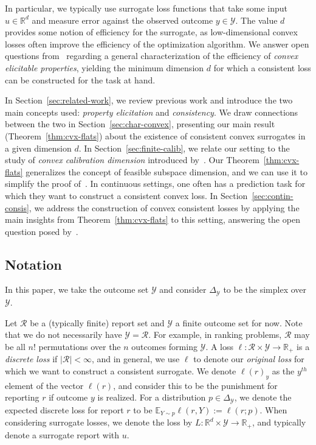 \documentclass{article}
\newcommand{\Comments}{1}
\newcommand{\mynote}[2]{\ifnum\Comments=1\textcolor{#1}{#2}\fi}
\newcommand{\jessie}[1]{\mynote{purple}{[JF: #1]}}
\newcommand{\reals}{\mathbb{R}}
\newcommand{\simplex}{\Delta_\Y}
\newcommand{\E}{\mathbb{E}}
\newcommand{\R}{\mathcal{R}}
\newcommand{\Y}{\mathcal{Y}}
\begin{document}
In particular, we typically use surrogate loss functions that take some input $u \in \reals^d$ and measure error against the observed outcome $y \in \Y$.
The value $d$ provides some notion of efficiency for the surrogate, as low-dimensional convex losses often improve the efficiency of the optimization algorithm.
We answer open questions from~\cite{frongillo2015elicitation} regarding a general characterization of the efficiency of \emph{convex elicitable properties}, yielding the minimum dimension $d$ for which a consistent loss can be constructed for the task at hand.

In Section~\ref{sec:related-work}, we review previous work and introduce the two main concepts used: \emph{property elicitation} and \emph{consistency}.
We draw connections between the two in Section~\ref{sec:char-convex}, presenting our main result (Theorem~\ref{thm:cvx-flats}) about the existence of consistent convex surrogates in a given dimension $d$.
In Section~\ref{sec:finite-calib}, we relate our setting to the study of \emph{convex calibration dimension} introduced by~\cite{ramaswamy2016convex}.
Our Theorem~\ref{thm:cvx-flats} generalizes the concept of feasible subspace dimension, and we can use it to simplify the proof of~\cite[Theorem \jessie{CHECK}]{ramaswamy2016convex}.
In continuous settings, one often has a prediction task for which they want to construct a consistent convex loss.
In Section~\ref{sec:contin-consis}, we address the construction of convex consistent losses by applying the main insights from Theorem~\ref{thm:cvx-flats} to this setting, answering the open question posed by~\cite[Ref?]{frongillo2015elicitation}.


\subsection{Notation}
In this paper, we take the outcome set $\Y$ and consider $\simplex$ to be the simplex over $\Y$.

Let $\R$ be a (typically finite) report set and $\Y$ a finite outcome set for now.
Note that we do not necessarily have $\Y = \R$.  
For example, in ranking problems, $\R$ may be all $n!$ permutations over the $n$ outcomes forming $\Y$.
A loss $\ell : \R \times \Y \to \reals_+$ is a \emph{discrete loss} if $|\R| < \infty$, and in general, we use $\ell$ to denote our \emph{original loss} for which we want to construct a consistent surrogate.
We denote $\ell(r)_y$ as the $y^{th}$ element of the vector $\ell(r)$, and consider this to be the punishment for reporting $r$ if outcome $y$ is realized.
For a distribution $p \in \simplex$, we denote the expected discrete loss for report $r$ to be $\E_{Y \sim p} \ell(r, Y) := \ell(r; p)$.
When considering surrogate losses, we denote the loss by $L : \reals^d \times \Y \to \reals_+$, and typically denote a surrogate report with $u$.
\end{document}
